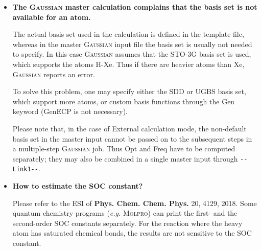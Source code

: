 \documentclass[UTF8]{article}
\begin{document}
\begin{itemize}
\item \textbf{The \textsc{Gaussian} master calculation complains that the basis set is not available for an atom.}

The actual basis set used in the calculation is defined in the template file, whereas in the master \textsc{Gaussian} input file
the basis set is usually not needed to specify. In this case \textsc{Gaussian} assumes that the \textsf{STO-3G} basis set is used,
which supports the atoms H-Xe. Thus if there are heavier atoms than Xe, \textsc{Gaussian} reports an error.

To solve this problem, one may specify either the \textsf{SDD} or \textsf{UGBS} basis set, which support more atoms,
or custom basis functions through the \textsf{Gen} keyword (\textsf{GenECP} is not necessary).

Please note that, in the case of \textsf{External} calculation mode, the non-default basis set in the master input
cannot be passed on to the subsequent steps in a multiple-step \textsc{Gaussian} job.
Thus \textsf{Opt} and \textsf{Freq} have to be computed separately; they may also be combined in a single master input
through \verb|--Link1--|.

\item \textbf{How to estimate the SOC constant?}

Please refer to the ESI of \textbf{Phys. Chem. Chem. Phys.} 20, 4129, 2018.
Some quantum chemistry programs (\textit{e.g.} \textsc{Molpro}) can print the first- and the second-order SOC constants separately.
For the reaction where the heavy atom has saturated chemical bonds, the results are not sensitive to the SOC constant.

%

\end{itemize}
\end{document}
